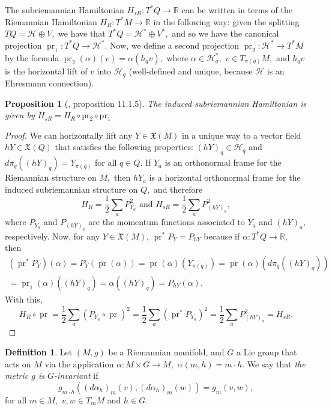 \documentclass[12pt, letterpaper, reqno]{amsart}
\theoremstyle{definition}
\newtheorem{df}{Definition}
\theoremstyle{plain}
\newtheorem{prop}{Proposition}
\theoremstyle{remark}
\begin{document}
The subriemannian Hamiltonian $ H_{sR}: T^*Q \rightarrow \mathbb{R}$ can be written in terms of the Riemannian Hamiltonian $ H_R: T^*M \rightarrow \mathbb{R} $ in the following way: given the splitting $ TQ= \mathcal{H}\oplus V, $ we have that $ T^*Q = \mathcal{H}^* \oplus V^*, $ and so we have the canonical projection $ \operatorname{pr}_1: T^*Q \rightarrow \mathcal{H}^*. $ Now, we define a second projection $ \operatorname{pr}_2: \mathcal{H}^* \rightarrow T^*M $ by the formula $ \operatorname{pr}_2(\alpha)(v)=\alpha(h_q v), $ where $ \alpha\in \mathcal{H}^*_q, $ $ v\in T_{\pi(q)}M, $ and $h_qv$ is the horizontal lift of $ v $ into $ \mathcal{H}_q $ (well-defined and unique, because $ \mathcal{H} $ is an Ehresmann connection).
\begin{prop}[\cite{montgomery2002tour}, proposition 11.1.5]
	The induced subriemannian Hamiltonian is given by $H_{sR}= H_R \circ \operatorname{pr_2}\circ \operatorname{pr_1}. $ 
\end{prop}

\begin{proof}
	We can horizontally lift any $ Y \in \mathfrak{X}(M) $ in a unique way to a vector field $ hY \in \mathfrak{X}(Q) $ that satisfies the following properties: $ (hY)_q \in \mathcal{H}_q $ and $ d\pi_q( (hY)_q) = Y_{\pi(q)}$ for all $ q\in Q. $  If $Y_a $ is an orthonormal frame for the Riemannian structure on $ M, $ then $ hY_a $ is a horizontal orthonormal frame for the induced subriemannian structure on $ Q, $ and therefore
	$$ H_R = \frac{1}{2} \sum^{}_{a} P_{Y_a}^2 \text{ and } H_{sR} = \frac{1}{2} \sum^{}_{a} P_{(hY)_a}^2, $$ 
	where $ P_{Y_a} $ and $ P_{(hY)_a} $ are the momentum functions associated to $ Y_a $ and $ (hY)_a, $ respectively. Now, for any $ Y\in \mathfrak{X}(M) $, $ \operatorname{pr} ^* P_Y = P_{hY}$ because if $ \alpha: T^*Q \rightarrow \mathbb{R}, $ then
	\begin{align*}
	(\operatorname{pr}^*P_Y)(\alpha)=P_Y( \operatorname{pr} (\alpha)) = \operatorname{pr} (\alpha) (Y_{\pi(q)}) = \operatorname{pr} (\alpha) \left( d\pi_q((hY)_q) \right) \\= \operatorname{pr}_1(\alpha) \left( (hY)_q \right) =\alpha( (hY)_q ) =  P_{hY}(\alpha).  
	\end{align*}
	With this, 
	$$ H_R \circ \operatorname{pr} = \frac{1}{2} \sum^{}_{a} (P_{Y_a}\circ \operatorname{pr} )^2 = \frac{1}{2} \sum^{}_{a} (\operatorname{pr}^* P_{Y_a})^2 = \frac{1}{2} \sum^{}_{a} P_{(hY)_a}^2=H_{sR}. $$ 
\end{proof}
\begin{df}
	Let $ (M,g) $ be a Riemannian manifold, and $G $ a Lie group that acts on $ M $ via the application $ \alpha: M\times G \rightarrow M, $ $ \alpha(m,h)= m\cdot h. $ We say that \textit{the metric $ g $ is $ G $-invariant} if  
	$$ g_{m\cdot h}((d\alpha_h)_m(v),(d\alpha_h)_m(w))=g_m(v,w), $$ 
	for all $ m\in M, $ $ v,w\in T_mM $ and $ h\in G. $ 
\end{df}
\end{document}
